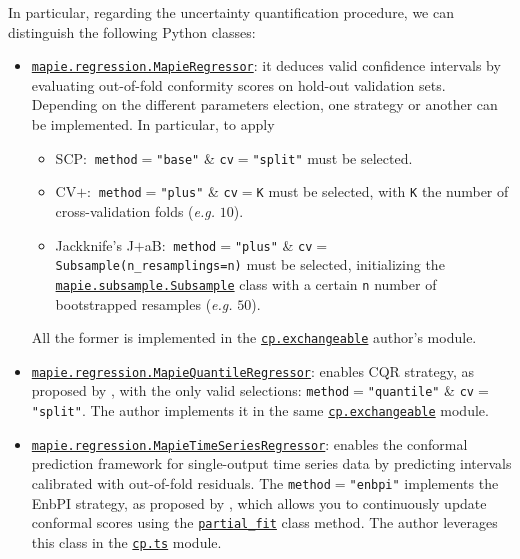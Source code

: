 In particular, regarding the uncertainty quantification procedure, we can distinguish the following Python classes:
\begin{itemize}
    \item \href{https://mapie.readthedocs.io/en/stable/generated/mapie.regression.MapieRegressor.html#mapie.regression.MapieRegressor}{\texttt{mapie.regression.MapieRegressor}}: it deduces valid confidence intervals by evaluating out-of-fold conformity scores on hold-out validation sets. Depending on the different parameters election, one strategy or another can be implemented. In particular, to apply
    \begin{itemize}
        \item SCP:$\ $ \texttt{method$=$"base"} \& \texttt{cv$=$"split"} must be selected.
        \item CV$+$:$\ $ \texttt{method$=$"plus"} \& \texttt{cv$=$K} must be selected, with \texttt{K} the number of cross-validation folds (\textit{e.g.} $10$).
        \item Jackknife's J$+$aB:$\ $ \texttt{method$=$"plus"} \& \texttt{cv$=$Subsample(n\_{}resamplings=n)} must be selected, initializing the \href{https://mapie.readthedocs.io/en/stable/generated/mapie.subsample.Subsample.html#mapie.subsample.Subsample}{\texttt{mapie.subsample.Subsample}} class with a certain \texttt{n} number of bootstrapped resamples (\textit{e.g.} $50$).        
    \end{itemize}
    All the former is implemented in the \href{https://github.com/gcastro-98/conformal-prediction/blob/main/cp/exchangeable.py}{\texttt{cp.exchangeable}} author's module.
    \item \href{https://mapie.readthedocs.io/en/stable/generated/mapie.regression.MapieQuantileRegressor.html#mapie.regression.MapieQuantileRegressor}{\texttt{mapie.regression.MapieQuantileRegressor}}: enables CQR strategy, as proposed by \cite{romano2019}, with the only valid selections: \texttt{method$=$"quantile"} \& \texttt{cv$=$"split"}. The author implements it in the same \href{https://github.com/gcastro-98/conformal-prediction/blob/main/cp/exchangeable.py}{\texttt{cp.exchangeable}} module.
    \item \href{https://mapie.readthedocs.io/en/stable/generated/mapie.regression.MapieTimeSeriesRegressor.html#mapie.regression.MapieTimeSeriesRegressor}{\texttt{mapie.regression.MapieTimeSeriesRegressor}}: enables the conformal prediction framework for single-output time series data by predicting intervals calibrated with out-of-fold residuals. The \texttt{method$=$"enbpi"} implements the EnbPI strategy, as proposed by \cite{chenxu2021a}, which allows you to continuously update conformal scores using the \href{https://mapie.readthedocs.io/en/stable/generated/mapie.regression.MapieTimeSeriesRegressor.html#mapie.regression.MapieTimeSeriesRegressor.partial_fit}{\texttt{partial\_{}fit}} class method. The author leverages this class in the \href{https://github.com/gcastro-98/conformal-prediction/blob/main/cp/ts.py}{\texttt{cp.ts}} module.
\end{itemize}

